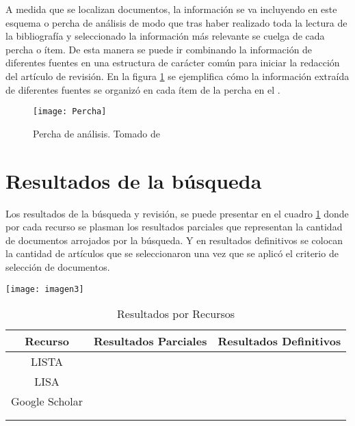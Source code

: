 A medida que se localizan documentos, la información se va incluyendo en este esquema o percha de análisis de modo que tras haber realizado toda la lectura de la bibliografía y seleccionado la información más relevante se cuelga de cada percha o ítem. De esta manera se puede ir combinando la información de diferentes fuentes en una estructura de carácter común para iniciar la redacci\'on del artículo de revisi\'on. 
En la figura \ref{fig:percha} se ejemplifica cómo la información extraída de diferentes fuentes se organizó en cada ítem de la percha en el \GU.




\begin{figure}%
	\texttt{[image: Percha]}
		\caption{Percha de an\'alisis. Tomado de \GU }
		\label{fig:percha}
\end{figure}
 




 \section{Resultados de la búsqueda}
 
 
 Los resultados de la búsqueda y revisión, se puede presentar en el cuadro \ref{tab:resultados} donde por cada recurso se plasman los resultados parciales que representan la cantidad de documentos arrojados por la búsqueda. Y en resultados definitivos se colocan la cantidad de artículos que se seleccionaron una vez que se aplicó  el criterio de selección de documentos.
 
 \begin{marginfigure}[-3.2cm]%
 	\texttt{[image: imagen3]}
 \end{marginfigure}
 


\begin{table}[h]
	\footnotesize%
	\begin{center}
		\footnotesize
		\begin{tabular}{|c|c|c|}
			\hline
			 Recurso & Resultados Parciales & Resultados Definitivos  \\
			\hline  			
		 {LISTA} &   &  \\
		 \hline
		  {LISA} &   &  \\
		  \hline
		  Google Scholar &   &  \\
		  \hline
	         	  &   &  \\
	         	  \hline
	              &   &  \\
	              
			\hline  			
			
		\end{tabular}
	\end{center}
	\caption{Resultados por Recursos }
	\label{tab:resultados}
\end{table}


